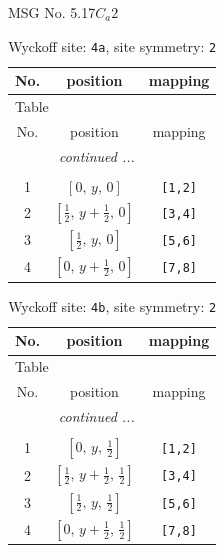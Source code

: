\documentclass[fleqn,8pt]{jsarticle}
\begin{document}
\setcounter{MaxMatrixCols}{32}

\renewcommand{\tablename}{Table~}
\renewcommand{\figurename}{Figure~}
\begin{center}
\LARGE
MSG No. 5.17\quad$C_{a}2$
\end{center}
\renewcommand{\arraystretch}{1.2}
\begin{longtable}{ccc}
\caption{Wyckoff site: {\tt 4a}, site symmetry: {\tt 2}}
 \\
 \hline \hline
No. & position & mapping \\ \hline \endfirsthead

\multicolumn{2}{l}{\tablename\ \thetable{}} \\
 \hline \hline
No. & position & mapping \\ \hline \endhead

 \hline \hline
\multicolumn{2}{r}{\footnotesize\it continued ...} \\ \endfoot

 \hline \hline
\multicolumn{2}{r}{} \\ \endlastfoot

1 & $\left[ 0,\, y,\, 0 \right]$ & {\tt [1,2]} \\ \hline
2 & $\left[ \frac{1}{2},\, y + \frac{1}{2},\, 0 \right]$ & {\tt [3,4]} \\ \hline
3 & $\left[ \frac{1}{2},\, y,\, 0 \right]$ & {\tt [5,6]} \\ \hline
4 & $\left[ 0,\, y + \frac{1}{2},\, 0 \right]$ & {\tt [7,8]} \\
\end{longtable}
\renewcommand{\arraystretch}{1.2}
\begin{longtable}{ccc}
\caption{Wyckoff site: {\tt 4b}, site symmetry: {\tt 2}}
 \\
 \hline \hline
No. & position & mapping \\ \hline \endfirsthead

\multicolumn{2}{l}{\tablename\ \thetable{}} \\
 \hline \hline
No. & position & mapping \\ \hline \endhead

 \hline \hline
\multicolumn{2}{r}{\footnotesize\it continued ...} \\ \endfoot

 \hline \hline
\multicolumn{2}{r}{} \\ \endlastfoot

1 & $\left[ 0,\, y,\, \frac{1}{2} \right]$ & {\tt [1,2]} \\ \hline
2 & $\left[ \frac{1}{2},\, y + \frac{1}{2},\, \frac{1}{2} \right]$ & {\tt [3,4]} \\ \hline
3 & $\left[ \frac{1}{2},\, y,\, \frac{1}{2} \right]$ & {\tt [5,6]} \\ \hline
4 & $\left[ 0,\, y + \frac{1}{2},\, \frac{1}{2} \right]$ & {\tt [7,8]} \\
\end{longtable}
\end{document}
